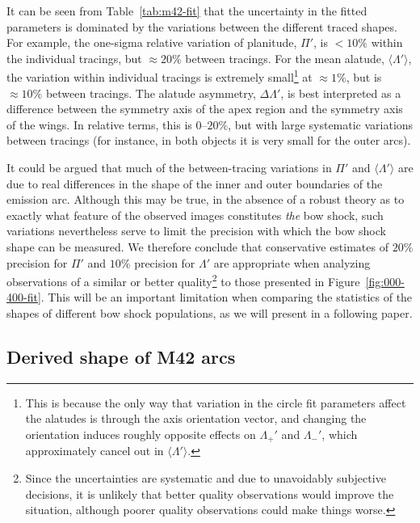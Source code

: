 It can be seen from Table~\ref{tab:m42-fit} that the uncertainty in
the fitted parameters is dominated by the variations between the
different traced shapes.  For example, the one-sigma relative
variation of planitude, \(\Pi'\), is \(< 10\%\) within the individual
tracings, but \(\approx 20\%\) between tracings.  For the mean alatude,
\(\langle\Lambda'\rangle\), the variation within individual tracings is extremely
small\footnote{%
  This is because the only way that variation in the circle fit
  parameters affect the alatudes is through the axis orientation
  vector, and changing the orientation induces roughly opposite
  effects on \(\Lambda_+'\) and \(\Lambda_-'\), which approximately cancel out in
  \(\langle\Lambda'\rangle\).  } %
at \(\approx 1\%\), but is \(\approx 10\%\) between tracings.  The alatude
asymmetry, \(\Delta\Lambda'\), is best interpreted as a difference between the
symmetry axis of the apex region and the symmetry axis of the wings.
In relative terms, this is \(0\)--\(20\%\), but with large systematic
variations between tracings (for instance, in both objects it is very
small for the outer arcs).

It could be argued that much of the between-tracing variations in
\(\Pi'\) and \(\langle\Lambda'\rangle\) are due to real differences in the shape of the
inner and outer boundaries of the emission arc.  Although this may be
true, in the absence of a robust theory as to exactly what feature of
the observed images constitutes \emph{the} bow shock, such variations
nevertheless serve to limit the precision with which the bow shock
shape can be measured.  We therefore conclude that conservative
estimates of \(20\%\) precision for \(\Pi'\) and \(10\%\) precision for
\(\Lambda'\) are appropriate when analyzing observations of a similar or
better quality\footnote{%
  Since the uncertainties are systematic and due to unavoidably
  subjective decisions, it is unlikely that better quality
  observations would improve the situation, although poorer quality
  observations could make things worse.  } %
to those presented in Figure~\ref{fig:000-400-fit}.  This will be an
important limitation when comparing the statistics of the shapes of
different bow shock populations, as we will present in a following
paper.

\subsection{Derived shape of M42 arcs}
\label{sec:derived-shape-m42}


